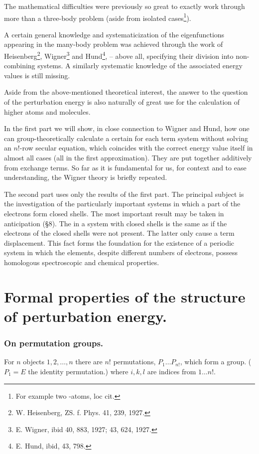 \begin{paper}{1}
The mathematical difficulties were previously so great to exactly work through more than a three-body problem (aside from isolated cases\footnote{For example two -atoms, loc cit.}).

A certain general knowledge and systematicization of the eigenfunctions appearing in the many-body problem was achieved through the work of Heisenberg\footnote{W. Heisenberg, ZS. f. Phys. 41, 239, 1927.}, Wigner\footnote{E. Wigner, ibid 40, 883, 1927; 43, 624, 1927.} and Hund\footnote{E. Hund, ibid, 43, 798.}, -- above all, specifying their division into non-combining systems. A similarly systematic knowledge of the associated energy values is still missing.

Aside from the above-mentioned theoretical interest, the answer to the question of the perturbation energy is also naturally of great use for the calculation of higher atoms and molecules.

In the first part we will show, in close connection to Wigner and Hund, how one can group-theoretically calculate a certain  for each term system without solving an $n!$-row secular equation, which coincides with the correct energy value itself in almost all cases (all in the first approximation). They are put together additively from exchange terms. So far as it is fundamental for us, for context and to ease understanding, the Wigner theory is briefly repeated. 

The second part uses only the results of the first part. The principal subject is the investigation of the particularly important systems in which a part of the electrons form closed shells. The most important result may be taken in anticipation (\S 8). The  in a system with closed shells is the same as if the electrons of the closed shells were not present. The latter only cause a term displacement. This fact forms the foundation for the existence of a periodic system in which the elements, despite different numbers of electrons, possess homologous spectroscopic and chemical properties.

\part{Formal properties of the structure of perturbation energy.}

\section{On permutation groups.} For $n$ objects $1,2,\dots,n$ there are $n!$ permutations, $P_1\dots P_{n!}$, which form a group. ($P_1=E$ the identity permutation.)
where $i,k,l$ are indices from $1\dots n!$.


\end{paper}
